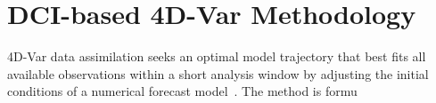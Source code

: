 \documentclass[final,1p,times]{elsarticle}
\begin{document}
\section{DCI-based 4D-Var Methodology}\label{sec:Methodology}
4D-Var data assimilation seeks an optimal model trajectory that best fits all available observations within a short analysis window by adjusting the initial conditions of a numerical forecast model~\citep{Talagrand1987}. 
The method is formu
\end{document}
